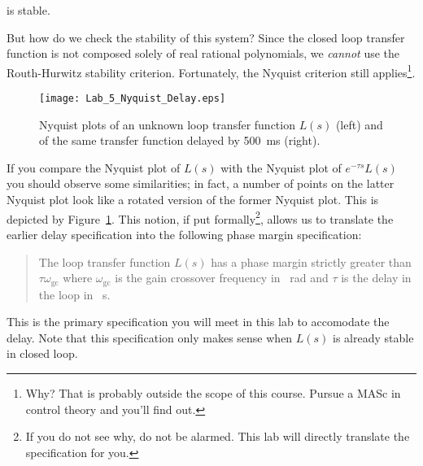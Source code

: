 \begin{center}
\end{center}
%
is stable.

But how do we check the stability of this system?
Since the closed loop transfer function is not composed solely of real rational polynomials, we \emph{cannot} use the Routh-Hurwitz stability criterion. Fortunately, the Nyquist criterion still applies\footnote{Why? That is probably outside the scope of this course. Pursue a MASc in control theory and you'll find out.}.
%
\begin{figure}
  \centering
  \texttt{[image: Lab\_5\_Nyquist\_Delay.eps]}
  \caption[Nyquist Plot of Transfer Functions with and without a delay.]{Nyquist plots of an unknown loop transfer function \(L(s)\) (left) and of the same transfer function delayed by \SI{500}{\milli\second} (right).}
  \label{fig:lab5:delay}
\end{figure}
%
If you compare the Nyquist plot of \(L(s)\) with the Nyquist plot of \(e^{-\tau s} L(s)\) you should observe some similarities;
in fact, a number of points on the latter Nyquist plot look like a rotated version of the former Nyquist plot.
This is depicted by Figure~\ref{fig:lab5:delay}.
This notion, if put formally\footnote{If you do not see why, do not be alarmed. This lab will directly translate the specification for you.}, allows us to translate the earlier delay specification into the following phase margin specification:
\begin{quote}
  The loop transfer function \(L(s)\) has a phase margin strictly greater than \(\tau \omega_{\mathrm{gc}}\) where \(\omega_{\mathrm{gc}}\) is the gain crossover frequency in \SI{}{\radian} and \(\tau\) is the delay in the loop in \SI{}{\second}.
\end{quote}
This is the primary specification you will meet in this lab to accomodate the delay.
Note that this specification only makes sense when \(L(s)\) is already stable in closed loop.

